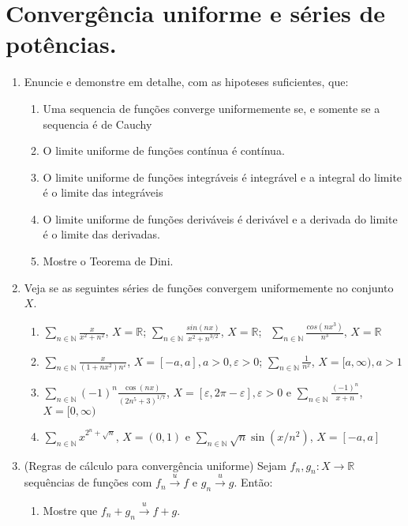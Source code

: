 \documentclass{article}
\theoremstyle{plain}
\theoremstyle{definition}
\theoremstyle{remark}
\begin{document}
\section{Convergência uniforme e séries de potências.} 
\begin{enumerate}
  \item Enuncie e demonstre em detalhe, com as hipoteses suficientes,  que:
    \begin{enumerate}
    \item Uma sequencia de funções converge uniformemente se, e somente se 
    a sequencia é de Cauchy
    \item O limite uniforme de funções contínua é contínua.
    \item O limite uniforme de funções integráveis é integrável e
    a integral do limite é o limite das integráveis
    \item O limite uniforme de funções deriváveis é derivável 
    e a derivada do limite é o limite das derivadas.
    \item Mostre o Teorema de Dini.
    \end{enumerate}
  \item Veja se as seguintes séries de funções convergem uniformemente 
  no conjunto $X$.
   \begin{enumerate}
     \item $\sum_{n \in \mathbb{N}} \frac{x}{x^2+n^2}$, $X=\mathbb{R}$;
      $\sum_{n \in \mathbb{N}} \frac{sin(nx)}{x^2+n^{3/2}}$, $X=\mathbb{R}$;
           $\ \ \sum_{n \in \mathbb{N}} \frac{cos(nx^3)}{n^3}$, $X=\mathbb{R}$
     \item $\sum_{n \in \mathbb{N}} \frac{x}{(1+nx^2)n^\varepsilon}$, $X=[-a,a], a>0,\varepsilon>0$;
      $\sum_{n \in \mathbb{N}} \frac{1}{n^{x}}$, $X=[a,\infty), a>1$
     \item $\sum_{n \in \mathbb{N}}(-1)^{n}\frac{\cos(nx)}{(2n^5+3)^{1/7}}$, $X=[\varepsilon, 2\pi-\varepsilon], \varepsilon>0$ e 
     $\sum_{n \in \mathbb{N}}\frac{(-1)^n}{x+n}$, $X=[0, \infty)$ 
     \item $\sum_{n \in \mathbb{N}}x^{ 2^{n}+\sqrt{n}}$, $X=(0,1)$ e 
     $\sum_{n \in \mathbb{N}} \sqrt{n}\sin(x/n^2)$, $X=[-a,a]$    
   \end{enumerate}
  \item (Regras de cálculo para convergência uniforme)
   Sejam $f_{n}, g_n:X \rightarrow \mathbb{R}$ sequências de funções
   com $f_{n}\xrightarrow{u} f$ e  $g_{n}\xrightarrow{u} g$. Então:
     \begin{enumerate}
     \item Mostre que $f_n+g_n \xrightarrow{u} f+g$.

\end{enumerate}
\end{enumerate}
\end{document}

